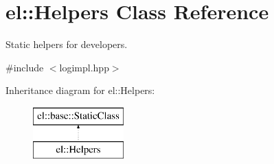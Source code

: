 \hypertarget{classel_1_1Helpers}{\section{el\-:\-:Helpers Class Reference}
\label{classel_1_1Helpers}
}


Static helpers for developers.  




{\ttfamily \#include $<$logimpl.\-hpp$>$}

Inheritance diagram for el\-:\-:Helpers\-:\begin{figure}[H]
\begin{center}
\leavevmode
\includegraphics[height=2.000000cm]{classel_1_1Helpers}
\end{center}
\end{figure}
